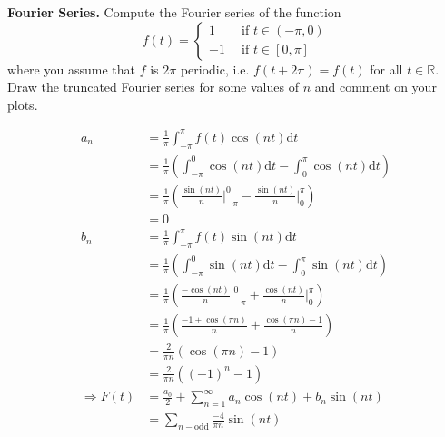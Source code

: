 \textbf{Fourier Series.} Compute the Fourier series of the
function
\[
f(t) = \left\{
\begin{aligned}
 1 &\,\,\, \text{if}\,\, t \in (-\pi, 0) \\
-1 &\,\,\, \text{if}\,\, t \in [0, \pi]
\end{aligned}
\right.
\]
where you assume that $f$ is $2\pi$ periodic, i.e. $f(t+2\pi) = f(t)$
for all $t \in \mathbb{R}$. Draw the truncated Fourier series for some
values of $n$ and comment on your plots.


{\color{blue}

\begin{align*}
a_n &= \frac{1}{\pi} \int_{-\pi}^{\pi} f(t) \cos(n t) \textrm{d}t \\
&= \frac{1}{\pi} \left(\int_{-\pi}^0 \cos(nt) \textrm{d}t -
\int_0^{\pi} \cos(nt) \textrm{d}t \right) \\
&= \frac{1}{\pi} \left( \frac{\sin(nt)}{n} \bigg|_{-\pi}^0 -
\frac{\sin(nt)}{n} \bigg|_0^{\pi} \right) \\
&= 0 \\
b_n &= \frac{1}{\pi} \int_{-\pi}^{\pi} f(t) \sin(n t) \textrm{d}t \\
&= \frac{1}{\pi} \left(\int_{-\pi}^0 \sin(nt) \textrm{d}t -
\int_0^{\pi} \sin(nt) \textrm{d}t \right) \\
&= \frac{1}{\pi} \left( \frac{-\cos(nt)}{n} \bigg|_{-\pi}^0 +
\frac{\cos(nt)}{n} \bigg|_0^{\pi} \right) \\
&= \frac{1}{\pi} \left(
\frac{-1 + \cos(\pi n)}{n}
+ \frac{\cos(\pi n) - 1}{n}
 \right) \\
&= \frac{2}{\pi n} \left(
 \cos(\pi n) - 1
 \right) \\
&= \frac{2}{\pi n} \left(
 (-1)^n - 1
 \right) \\
\Rightarrow F(t) &= \frac{a_0}{2} + \sum_{n=1}^\infty a_n \cos(n t) +
b_n \sin(n t) \\
&= \sum_{n-\textrm{odd}} \frac{-4}{\pi n} \sin(n t)
\end{align*}
}
